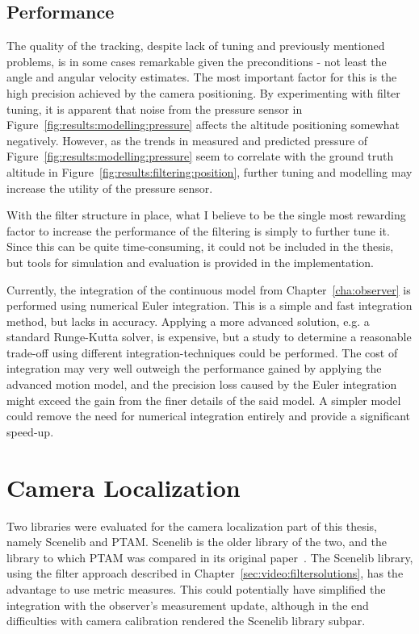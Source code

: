         \subsection{Performance}
            The quality of the tracking, despite lack of tuning and previously
            mentioned problems, is in some cases remarkable given the
            preconditions - not least the angle and angular velocity estimates.
            The most important factor for this is the high precision achieved by the
            camera positioning. By experimenting with filter tuning, it
            is apparent that noise from the pressure sensor
            in Figure~\ref{fig:results:modelling:pressure} affects the altitude positioning
            somewhat negatively. However, as the trends in measured and predicted pressure of Figure~\ref{fig:results:modelling:pressure}
            seem to correlate with the ground truth altitude in Figure~\ref{fig:results:filtering:position},
            further tuning and modelling may increase the utility of the pressure sensor.

            With the filter structure in place, what I believe to be the single
            most rewarding factor to increase the performance of the filtering
            is simply to further tune it. Since this can be quite time-consuming,
            it could not be included in the thesis, but tools for simulation
            and evaluation is provided in the implementation.

            Currently, the integration of the continuous model from Chapter~\ref{cha:observer}
            is performed using numerical Euler integration.
            This is a simple and fast integration method, but lacks in accuracy.
            Applying a more advanced solution, e.g. a standard Runge-Kutta solver,
            is expensive, but a study to determine a reasonable trade-off
            using different integration-techniques could be performed.
            The cost of integration may very well outweigh
            the performance gained by applying the advanced motion model,
            and the precision loss caused by the Euler integration might
            exceed the gain from the finer details of the said model.
            A simpler model could remove the need for numerical integration
            entirely and provide a significant speed-up.

    \section{Camera Localization}
        Two libraries were evaluated for the camera localization part of this thesis,
        namely Scenelib and PTAM. Scenelib is the older library of the two,
        and the library to which PTAM was compared in its original paper~\citep{klein07parallel}.
        The Scenelib library, using the filter approach described in Chapter~\ref{sec:video:filtersolutions},
        has the advantage to use metric measures.
        This could potentially have simplified the integration with the
        observer's measurement update, although in the end difficulties
        with camera calibration rendered the Scenelib library subpar.

